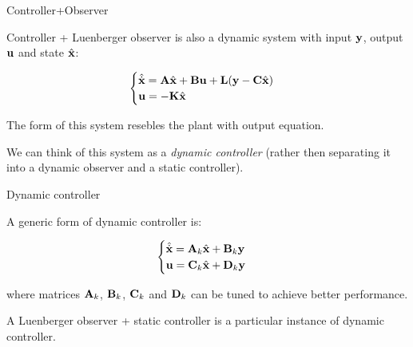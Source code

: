 \documentclass{beamer}
\begin{document}
\begin{frame}{Controller+Observer}
	\begin{flushleft}
		
		Controller + Luenberger observer is also a dynamic system with input $\mathbf{y}$, output $\mathbf{u}$ and state $\hat{\mathbf{x}}$:
		
		\begin{equation}
			\begin{cases}
				\hat{\dot {\mathbf{x}}} = \mathbf{A} \hat{\mathbf{x}} + \mathbf{B} \mathbf u + \mathbf{L}(\mathbf y - \mathbf{C} \hat{\mathbf{x}})
				\\
				\mathbf{u} = -\mathbf{K} \hat{\mathbf{x}}
			\end{cases}
		\end{equation}
		
		The form of this system resebles the plant with output equation.
		
		\bigskip
		
		We can think of this system as a \emph{dynamic controller} (rather then separating it into a dynamic observer and a static controller). 
		
	\end{flushleft}
\end{frame}




\begin{frame}{Dynamic controller}
	\begin{flushleft}
		
		A generic form of dynamic controller is:
		
		\begin{equation}
			\begin{cases}
				\hat{\dot {\mathbf{x}}} = \mathbf{A}_k \hat{\mathbf{x}} + \mathbf{B}_k \mathbf{y}
				\\
				\mathbf{u} = \mathbf{C}_k \hat{\mathbf{x}} + \mathbf{D}_k \mathbf{y}
			\end{cases}
		\end{equation}
		
		where matrices $\mathbf{A}_k$, $\mathbf{B}_k$, $\mathbf{C}_k$ and $\mathbf{D}_k$ can be tuned to achieve better performance.
		
		\bigskip
		
		A Luenberger observer + static controller is a particular instance of dynamic controller.
		
	\end{flushleft}
\end{frame}
\end{document}
